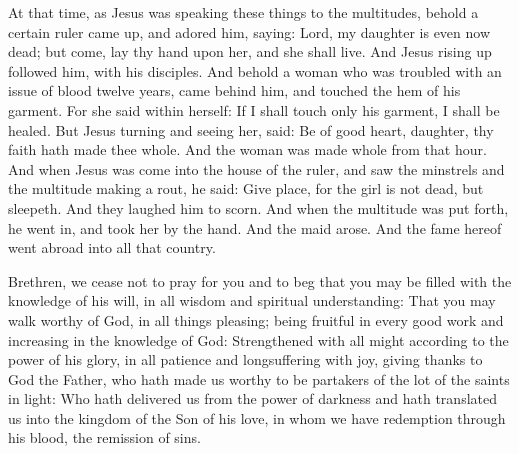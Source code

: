 \begin{multicols}{2}

At that time, as Jesus was speaking these things to the multitudes, behold a certain ruler
came up, and adored him, saying: Lord, my daughter is even now dead; but
come, lay thy hand upon her, and she shall live.
And Jesus rising up followed him, with his disciples.
And behold a woman who was troubled with an issue of blood twelve
years, came behind him, and touched the hem of his garment.
For she said within herself: If I shall touch only his garment, I
shall be healed.
But Jesus turning and seeing her, said: Be of good heart,
daughter, thy faith hath made thee whole. And the woman was made whole
from that hour.
And when Jesus was come into the house of the ruler, and saw the
minstrels and the multitude making a rout,
he said: Give place, for the girl is not dead, but sleepeth. And
they laughed him to scorn.
And when the multitude was put forth, he went in, and took her by
the hand. And the maid arose.
And the fame hereof went abroad into all that country.

\bigskip




Brethren, %
we cease not to pray
for you and to beg that you may be filled with the knowledge of his
will, in all wisdom and spiritual understanding:
That you may walk worthy of God, in all things pleasing; being
fruitful in every good work and increasing in the knowledge of God:
Strengthened with all might according to the power of his glory,
in all patience and longsuffering with joy,
giving thanks to God the Father, who hath made us worthy to be
partakers of the lot of the saints in light:
Who hath delivered us from the power of darkness and hath
translated us into the kingdom of the Son of his love,
in whom we have redemption through his blood, the remission of
sins.




\end{multicols}
